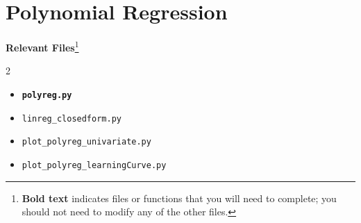 \documentclass{article}
\begin{document}
\newpage
\section*{Polynomial Regression}
{\bf Relevant Files}\footnote{{\bf Bold text} indicates files or functions that you will need to complete; you should not need to modify any of the other files.}
\vspace{-1.2em}
\begin{multicols}{2}
    \begin{itemize}[noitemsep,nolistsep]
        \item \texttt{\bf polyreg.py}
        \item \texttt{linreg\_closedform.py}
        \item \texttt{plot\_polyreg\_univariate.py}
        \item \texttt{plot\_polyreg\_learningCurve.py}
    \end{itemize}
\end{multicols}
\end{document}
